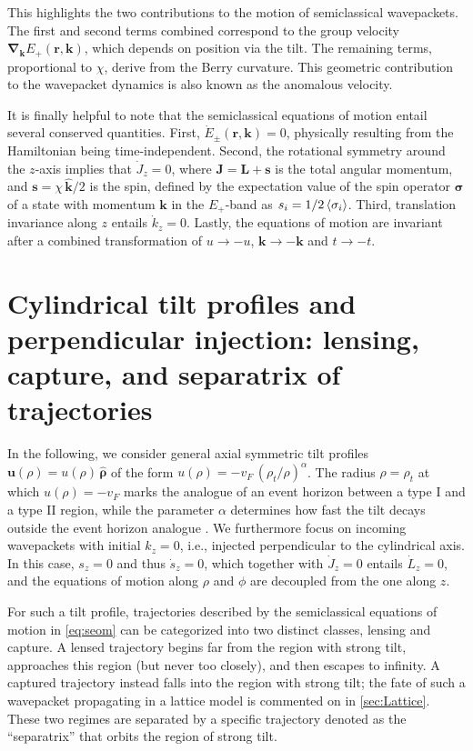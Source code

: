 \documentclass[submission, Phys]{SciPost}
\begin{document}
This highlights the two contributions to the motion of semi\-classi\-cal wave\-packets.
The first and second terms combined correspond to the group velocity $\bm\nabla_{\bm{k}} E_+(\bm{r},\bm{k})$, which depends on position via the tilt.
The remaining terms, proportional to $\chi$, derive from the Berry curvature.
This geometric contribution to the wavepacket dynamics is also known as the anomalous velocity.

It is finally helpful to note that the semiclassical equations of motion entail several conserved quantities.
First, $\dot E_\pm(\bm{r}, \bm{k}) = 0$, physically resulting from the Hamiltonian being time-independent.
Second, the rotational symmetry around the $z$-axis implies that $\dot J_z=0$, where $\bm{J}=\bm{L}+\bm{s}$ is the total angular momentum, and $\bm{s} = \chi \,\hat{\bm k}/2$ is the spin, defined by the expectation value of the spin operator ${\bm{\sigma}}$ of a state with momentum $\bm{k}$ in the $E_+$-band as $s_i=1/2\braket{\sigma_i}$. Third, translation invariance along $z$ entails $\dot k_z=0$.
Lastly, the equations of motion are invariant after a combined transformation of $u\rightarrow -u$, $\bm k\rightarrow-\bm k$ and $t\rightarrow-t$.

\section{Cylindrical tilt profiles and perpendicular injection: lensing, capture, and separatrix of trajectories}
\label{sec:Cylindrical}

In the following, we consider general axial symmetric tilt profiles $\bm{u}(\rho)= u(\rho)\, \hat{\bm \rho}$ of the form $u(\rho)=-v_F\,(\rho_t/\rho)^\alpha$.
The radius $\rho=\rho_t$ at which $u(\rho)=-v_F$ marks the analogue of an event horizon between a type I and a type II region, while the parameter $\alpha$ determines how fast the tilt decays outside the event horizon analogue \cite{Volovik2016,Volovik2017,De_Beule_2021,Sabsovich_2022}. We furthermore focus on incoming wavepackets with initial $k_z=0$, i.e., injected perpendicular to the cylindrical axis. In this case, $s_z=0$ and thus $\dot s_z=0$, which together with $\dot J_z=0$ entails $\dot L_z=0$, and the equations of motion along $\rho$ and $\phi$ are decoupled from the one along $z$.


For such a tilt profile, trajectories described by the semiclassical equations of motion in \cref{eq:seom} can be categorized into two distinct classes, lensing and capture.
A lensed trajectory begins far from the region with strong tilt, approaches this region (but never too closely), and then escapes to infinity.
A captured trajectory instead falls into the region with strong tilt; the fate of such a wavepacket propagating in a lattice model is commented on in \cref{sec:Lattice}.
These two regimes are separated by a specific trajectory denoted as the ``separatrix'' that orbits the region of strong tilt.
\end{document}
